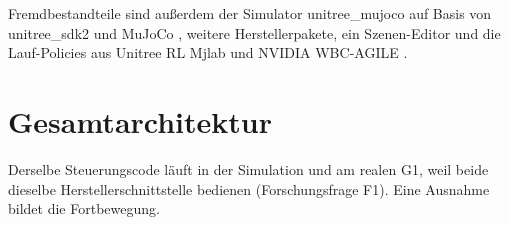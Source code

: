 
Fremdbestandteile sind außerdem der Simulator unitree\_mujoco auf Basis von unitree\_sdk2 und MuJoCo \cite{UnitreeMujoco}, weitere Herstellerpakete, ein Szenen-Editor und die Lauf-Policies aus Unitree RL Mjlab \cite{UnitreeRLMjlab} und NVIDIA WBC-AGILE .

\section{Gesamtarchitektur}
\label{sec:architektur}
Derselbe Steuerungscode läuft in der Simulation und am realen G1, weil beide dieselbe Herstellerschnittstelle bedienen (Forschungsfrage F1).
Eine Ausnahme bildet die Fortbewegung.

